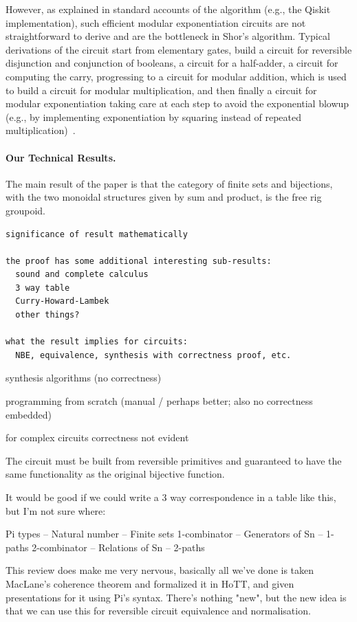\noindent However, as explained in standard accounts of the algorithm (e.g., the Qiskit implementation), such efficient
modular exponentiation circuits are not straightforward to derive and are the bottleneck in Shor’s algorithm. Typical
derivations of the circuit start from elementary gates, build a circuit for reversible disjunction and conjunction of
booleans, a circuit for a half-adder, a circuit for computing the carry, progressing to a circuit for modular addition,
which is used to build a circuit for modular multiplication, and then finally a circuit for modular exponentiation
taking care at each step to avoid the exponential blowup (e.g., by implementing exponentiation by squaring instead of repeated
multiplication)~\cite{shorefficient}.

\paragraph*{Our Technical Results.} The main result of the paper is that the category of finite sets and bijections,
with the two monoidal structures given by sum and product, is the free rig groupoid.

\begin{verbatim}
significance of result mathematically

the proof has some additional interesting sub-results:
  sound and complete calculus
  3 way table
  Curry-Howard-Lambek
  other things?

what the result implies for circuits:
  NBE, equivalence, synthesis with correctness proof, etc.
\end{verbatim}

synthesis algorithms (no correctness)

programming from scratch (manual / perhaps better; also no correctness embedded)

for complex circuits correctness not evident


The circuit must be built from reversible primitives and guaranteed to have the same functionality as the original bijective function.

It would be good if we could write a 3 way correspondence in a table like this, but I'm not sure where:

Pi types -- Natural number -- Finite sets
1-combinator -- Generators of Sn -- 1-paths
2-combinator -- Relations of Sn -- 2-paths

This review does make me very nervous, basically all we've done is taken MacLane's coherence theorem and formalized it in HoTT, and given presentations for it using Pi's syntax. There's nothing "new", but the new idea is that we can use this for reversible circuit equivalence and normalisation.

